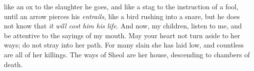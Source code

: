 \begin{biblechapter}
like an ox to the slaughter he goes, 
and like a stag to the instruction of a fool,
\verse until an arrow pierces his \textit{entrails}, 
like a bird rushing into a snare, 
but he does not know that \textit{it will cost him his life}.
 And now, my children, listen to me, 
and be attentive to the sayings of my mouth.
\verse May your heart not turn aside to her ways; 
do not stray into her path.
\verse For many slain she has laid low, 
and countless are all of her killings.
\verse The ways of Sheol are her house, 
descending to chambers of death.
\end{biblechapter}

